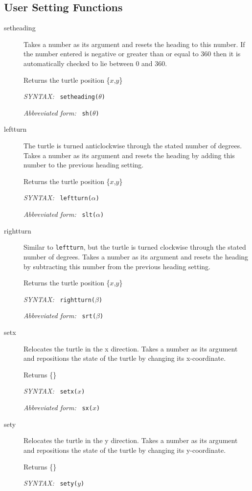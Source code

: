 \documentclass[11pt]{article}
\newcommand{\syntax}{\textsl{SYNTAX: }}
\newcommand{\abb}{\textsl{Abbreviated form: }}
\begin{document}
\subsection{User Setting Functions}
\begin{description}
 \item[setheading] Takes a number as its argument and resets the heading
       to this number. If the number entered is negative or greater than
       or equal to 360 then it is automatically checked to lie between 0
       and 360.

       Returns the turtle position \{$x$,$y$\}

       \syntax\ {\tt setheading($\theta$)}

       \abb\ {\tt sh($\theta$)}
 \item[leftturn]  The turtle is turned anticlockwise through the
       stated number of degrees. Takes a number as its argument and
       resets the heading by adding this number to the previous heading
       setting.

       Returns the turtle position \{$x$,$y$\}

       \syntax\ {\tt leftturn($\alpha$)}

       \abb\ {\tt slt($\alpha$)}
 \item[rightturn] Similar to {\tt leftturn}, but the turtle is turned
       clockwise through the stated number of degrees. Takes a number as
       its argument and resets the heading by subtracting this number from
       the previous heading setting.

       Returns the turtle position \{$x$,$y$\}

       \syntax\ {\tt rightturn($\beta$)}

       \abb\ {\tt srt($\beta$)}
 \item[setx] Relocates the turtle in the x direction. Takes a number as
       its argument and repositions the state of the turtle by changing its
       x-coordinate.

       Returns \{\}

       \syntax\ {\tt setx($x$)}

       \abb\ {\tt sx($x$)}
 \item[sety] Relocates the turtle in the y direction. Takes a number as   
       its argument and repositions the state of the turtle by changing its
       y-coordinate.

       Returns \{\}

       \syntax\ {\tt sety($y$)}


\end{description}
\end{document}
